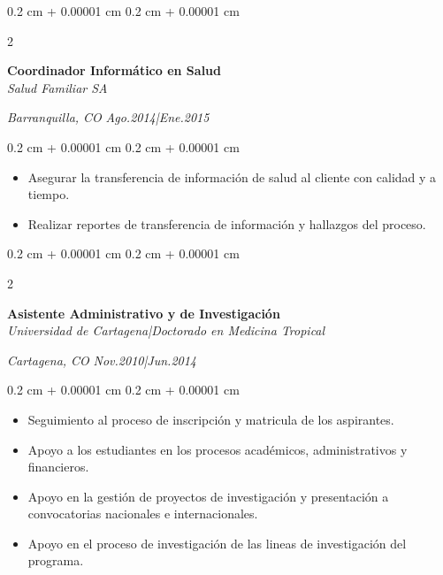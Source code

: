 \documentclass[10pt, letterpaper]{article}
\newenvironment{highlights}{
    \begin{itemize}[
        topsep=0.10 cm,
        parsep=0.10 cm,
        partopsep=0pt,
        itemsep=0pt,
        leftmargin=0.4 cm + 10pt
    ]
}{
    \end{itemize}
} %
\newenvironment{onecolentry}{
    \begin{adjustwidth}{
        0.2 cm + 0.00001 cm
    }{
        0.2 cm + 0.00001 cm
    }
}{
    \end{adjustwidth}
} %
\newenvironment{twocolentry}[2][]{
    \onecolentry
    \def\secondColumn{#2}
    \setcolumnwidth{\fill, 4.5 cm}
    \begin{paracol}{2}
}{
    \switchcolumn \raggedleft \secondColumn
    \end{paracol}
    \endonecolentry
} %
\begin{document}
        \begin{twocolentry}{
            \textit{Barranquilla, CO}
            \textit{Ago.2014|Ene.2015}}
            \textbf{Coordinador Informático en Salud}\\
            \textit{Salud Familiar SA}
        \end{twocolentry}
        \vspace{0.10 cm}
        \begin{onecolentry}
            \begin{highlights}
                \item Asegurar la transferencia de información de salud al cliente con calidad y a tiempo.
                \item Realizar reportes de transferencia de información y hallazgos del proceso.
            \end{highlights}
        \end{onecolentry}
        \vspace{0.2 cm}

        \begin{twocolentry}{
            \textit{Cartagena, CO}
            \textit{Nov.2010|Jun.2014}}
            \textbf{Asistente Administrativo y de Investigación}\\
            \textit{Universidad de Cartagena|Doctorado en Medicina Tropical}
        \end{twocolentry}
        \vspace{0.10 cm}
        \begin{onecolentry}
            \begin{highlights}
                \item Seguimiento al proceso de inscripción y matricula de los aspirantes.
                \item Apoyo a los estudiantes en los procesos académicos, administrativos y financieros.
                \item Apoyo en la gestión de proyectos de investigación y presentación a convocatorias nacionales e internacionales.
                \item Apoyo en el proceso de investigación de las lineas de investigación del programa.
            \end{highlights}
        \end{onecolentry}
        \vspace{0.2 cm}
\end{document}
